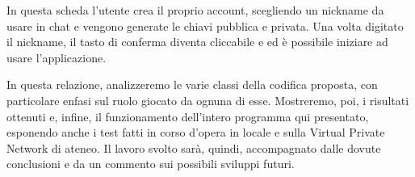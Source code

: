 In questa scheda l'utente crea il proprio account, scegliendo un nickname da usare in chat
e vengono generate le chiavi pubblica e privata. Una volta digitato il nickname, il tasto
di conferma diventa cliccabile e ed è possibile iniziare ad usare l'applicazione.

In questa relazione, analizzeremo le varie classi della codifica proposta,
con particolare enfasi sul ruolo giocato da ognuna di esse.
Mostreremo, poi, i risultati ottenuti e, infine,
il funzionamento dell'intero programma qui presentato,
esponendo anche i test fatti in corso d'opera
in locale e sulla Virtual Private Network di ateneo.
Il lavoro svolto sarà, quindi, accompagnato dalle dovute conclusioni e
da un commento sui possibili sviluppi futuri.